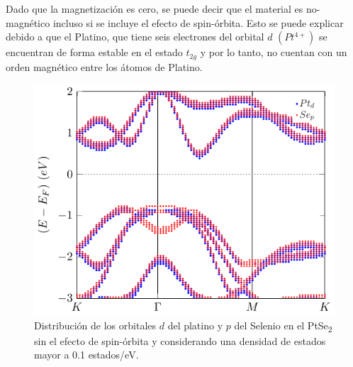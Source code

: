  Dado que la magnetizaci\'on es cero, se puede decir que el material es no-magn\'etico incluso si se incluye el efecto de spin-\'orbita. Esto se puede explicar debido a que el Platino, que  tiene seis electrones del orbital $d$  $(Pt^{4+})$ se encuentran de forma estable en el estado $t_{2g}$ \cite{doi:10.1063/1.4955468} y por lo tanto, no cuentan con   un orden magn\'etico entre los \'atomos de Platino. 
\begin{figure}[!hbt]
	\centering
	\includegraphics[scale=1]{figRes/PtSe2/bandas/projbandorb/orbproj.pdf}
	\caption[Distribuci\'on de orbitales $d$ y $p$ del Platino y Selenio respectivamente el ep PtSe\textsubscript{2}.]{Distribuci\'on de los orbitales $d$ del platino y $p$ del Selenio en el PtSe\textsubscript{2} sin el efecto de spin-\'orbita y considerando una densidad de estados mayor a 0.1 estados/eV. }
	\label{Sim:fig:pdosPtse2cU}
\end{figure}
